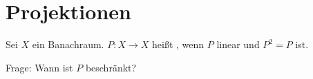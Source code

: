 
\section{Projektionen}



\begin{definition} \label{def:11.1-Projektion}
	Sei $X$ ein Banachraum. $P: X \rightarrow X$ hei{\ss}t , wenn $P$ linear und $P^{2} = P$ ist.
\end{definition}

Frage: Wann ist $P$ beschränkt?

\begin{beispiel}
	
\end{beispiel}



\newpage